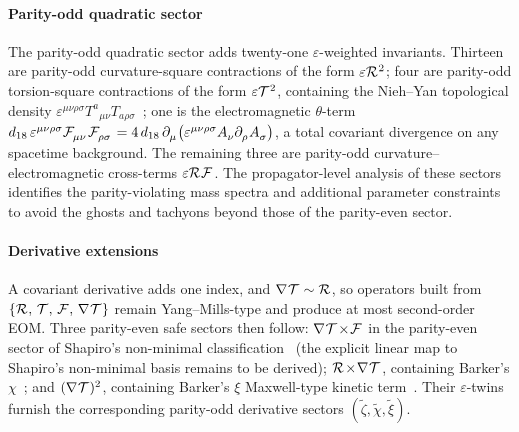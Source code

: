 \paragraph*{Parity-odd quadratic sector}
\label{ParityOddQuadratic}
The parity-odd quadratic sector adds twenty-one
$\varepsilon$-weighted invariants.
Thirteen are parity-odd curvature-square contractions of the
form $\varepsilon \MAGF{}^2$; four are
parity-odd torsion-square contractions of the form
$\varepsilon \MAGT{}^2$, containing the Nieh--Yan
topological density
$\varepsilon^{\mu\nu\rho\sigma}T^a{}_{\mu\nu}T_{a\rho\sigma}$~\cite{niehyan1982,hehlobukhov2007cartan};
one is the electromagnetic
$\theta$-term~\cite{wilczek1987axion}
$d_{18}\,\varepsilon^{\mu\nu\rho\sigma}\FieldF{_{\mu\nu}}\FieldF{_{\rho\sigma}} = 4\,d_{18}\,\PD{_\mu}\bigl(\varepsilon^{\mu\nu\rho\sigma}\FieldA{_\nu}\PD{_\rho}\FieldA{_\sigma}\bigr)$,
a total covariant divergence on any spacetime background. The remaining three
are parity-odd curvature--electromagnetic cross-terms
$\varepsilon\MAGF{}\FieldF{}$. The propagator-level analysis of
these
sectors~\cite{karananas2014parity,blagojevic2018hamiltonian,barker2025psalter2}
identifies the parity-violating mass spectra and
additional parameter constraints to avoid the ghosts and
tachyons beyond those of the parity-even sector.

\paragraph*{Derivative extensions}
\label{DerivativeExtensions}
A covariant derivative adds one index,
and $\rcD{}\MAGT{} \sim \MAGF{}$, so
operators built from $\{\MAGF{},\,\MAGT{},\,\FieldF{},\,\rcD{}\MAGT{}\}$
remain Yang--Mills-type and produce at most second-order
EOM.
Three parity-even safe sectors then follow:
$\rcD{}\MAGT{}\!\times\!\FieldF{}$
in the parity-even sector of Shapiro's
non-minimal classification~\cite{shapiro2002torsion} (the
explicit linear map to Shapiro's non-minimal basis remains to
be derived);
$\MAGF{}\!\times\!\rcD{}\MAGT{}$, containing Barker's $\chi$~\cite{barker2024poincare};
and $(\rcD{}\MAGT{})^2$, containing Barker's $\xi$ Maxwell-type
kinetic term~\cite{barker2024poincare,barker2021hamiltonian,bahamonde2025torsion}. Their
$\varepsilon$-twins furnish the corresponding parity-odd
derivative sectors $(\tilde\zeta,\tilde\chi,\tilde\xi)$.

